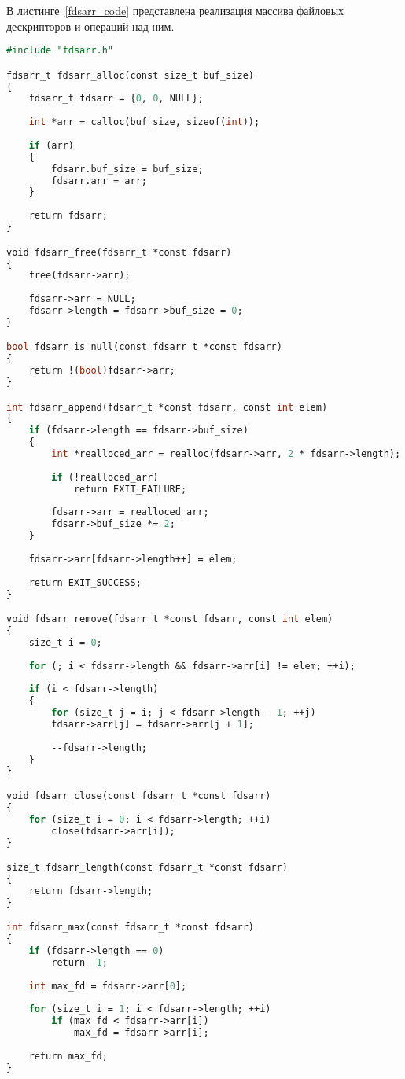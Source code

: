 В листинге~\ref{fdsarr_code} представлена реализация массива файловых дескрипторов и операций над ним.
\begin{lstlisting}[label=fdsarr_code,caption=Реализация массива файловых дескрипторов и операций над ним,language=Caml]
#include "fdsarr.h"

fdsarr_t fdsarr_alloc(const size_t buf_size)
{
	fdsarr_t fdsarr = {0, 0, NULL};
	
	int *arr = calloc(buf_size, sizeof(int));
	
	if (arr)
	{
		fdsarr.buf_size = buf_size;
		fdsarr.arr = arr;
	}
	
	return fdsarr;
}

void fdsarr_free(fdsarr_t *const fdsarr)
{
	free(fdsarr->arr);
	
	fdsarr->arr = NULL;
	fdsarr->length = fdsarr->buf_size = 0;
}

bool fdsarr_is_null(const fdsarr_t *const fdsarr)
{
	return !(bool)fdsarr->arr;
}

int fdsarr_append(fdsarr_t *const fdsarr, const int elem)
{
	if (fdsarr->length == fdsarr->buf_size)
	{
		int *realloced_arr = realloc(fdsarr->arr, 2 * fdsarr->length);
		
		if (!realloced_arr)
			return EXIT_FAILURE;
		
		fdsarr->arr = realloced_arr;
		fdsarr->buf_size *= 2;
	}
	
	fdsarr->arr[fdsarr->length++] = elem;
	
	return EXIT_SUCCESS;
}

void fdsarr_remove(fdsarr_t *const fdsarr, const int elem)
{
	size_t i = 0;
	
	for (; i < fdsarr->length && fdsarr->arr[i] != elem; ++i);
	
	if (i < fdsarr->length)
	{
		for (size_t j = i; j < fdsarr->length - 1; ++j)
		fdsarr->arr[j] = fdsarr->arr[j + 1];
		
		--fdsarr->length;
	}
}

void fdsarr_close(const fdsarr_t *const fdsarr)
{
	for (size_t i = 0; i < fdsarr->length; ++i)
		close(fdsarr->arr[i]);
}

size_t fdsarr_length(const fdsarr_t *const fdsarr)
{
	return fdsarr->length;
}

int fdsarr_max(const fdsarr_t *const fdsarr)
{
	if (fdsarr->length == 0)
		return -1;
	
	int max_fd = fdsarr->arr[0];
	
	for (size_t i = 1; i < fdsarr->length; ++i)
		if (max_fd < fdsarr->arr[i])
			max_fd = fdsarr->arr[i];
	
	return max_fd;
}
\end{lstlisting}

